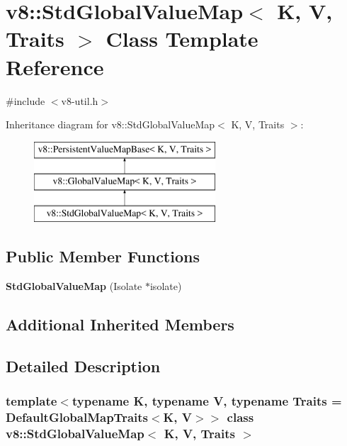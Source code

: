 \hypertarget{classv8_1_1StdGlobalValueMap}{}\section{v8\+:\+:Std\+Global\+Value\+Map$<$ K, V, Traits $>$ Class Template Reference}
\label{classv8_1_1StdGlobalValueMap}


{\ttfamily \#include $<$v8-\/util.\+h$>$}

Inheritance diagram for v8\+:\+:Std\+Global\+Value\+Map$<$ K, V, Traits $>$\+:\begin{figure}[H]
\begin{center}
\leavevmode
\includegraphics[height=3.000000cm]{classv8_1_1StdGlobalValueMap}
\end{center}
\end{figure}
\subsection*{Public Member Functions}
\begin{DoxyCompactItemize}
\item 
\mbox{\label{classv8_1_1StdGlobalValueMap_af1025915a269b8b37af93ffc2ad5c3b1}} 
{\bfseries Std\+Global\+Value\+Map} (Isolate $\ast$isolate)
\end{DoxyCompactItemize}
\subsection*{Additional Inherited Members}


\subsection{Detailed Description}
\subsubsection*{template$<$typename K, typename V, typename Traits = Default\+Global\+Map\+Traits$<$\+K, V$>$$>$\newline
class v8\+::\+Std\+Global\+Value\+Map$<$ K, V, Traits $>$}

